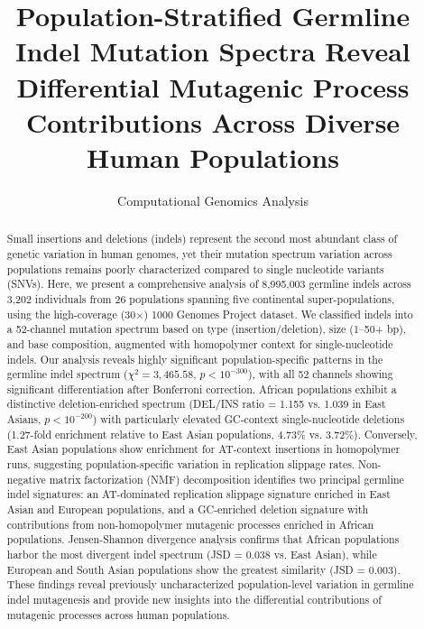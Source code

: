 \documentclass[11pt,a4paper]{article}
\title{Population-Stratified Germline Indel Mutation Spectra Reveal Differential Mutagenic Process Contributions Across Diverse Human Populations}
\author{Computational Genomics Analysis}
\date{}
\begin{document}
\maketitle

\begin{center}
\end{center}
\vspace{8pt}

\begin{abstract}
Small insertions and deletions (indels) represent the second most abundant class of genetic variation in human genomes, yet their mutation spectrum variation across populations remains poorly characterized compared to single nucleotide variants (SNVs). Here, we present a comprehensive analysis of 8,995,003 germline indels across 3,202 individuals from 26 populations spanning five continental super-populations, using the high-coverage (30$\times$) 1000 Genomes Project dataset. We classified indels into a 52-channel mutation spectrum based on type (insertion/deletion), size (1--50+ bp), and base composition, augmented with homopolymer context for single-nucleotide indels. Our analysis reveals highly significant population-specific patterns in the germline indel spectrum ($\chi^2 = 3{,}465.58$, $p < 10^{-300}$), with all 52 channels showing significant differentiation after Bonferroni correction. African populations exhibit a distinctive deletion-enriched spectrum (DEL/INS ratio = 1.155 vs. 1.039 in East Asians, $p < 10^{-200}$) with particularly elevated GC-context single-nucleotide deletions (1.27-fold enrichment relative to East Asian populations, 4.73\% vs. 3.72\%). Conversely, East Asian populations show enrichment for AT-context insertions in homopolymer runs, suggesting population-specific variation in replication slippage rates. Non-negative matrix factorization (NMF) decomposition identifies two principal germline indel signatures: an AT-dominated replication slippage signature enriched in East Asian and European populations, and a GC-enriched deletion signature with contributions from non-homopolymer mutagenic processes enriched in African populations. Jensen-Shannon divergence analysis confirms that African populations harbor the most divergent indel spectrum (JSD = 0.038 vs. East Asian), while European and South Asian populations show the greatest similarity (JSD = 0.003). These findings reveal previously uncharacterized population-level variation in germline indel mutagenesis and provide new insights into the differential contributions of mutagenic processes across human populations.
\end{abstract}
\end{document}
